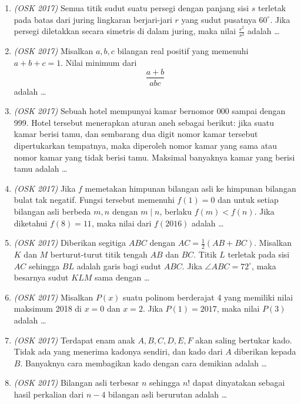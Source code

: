 \documentclass[11pt]{scrartcl}
\begin{document}
\begin{enumerate}
    \item \textit{(OSK 2017)}  Semua titik sudut suatu persegi dengan panjang sisi $s$ terletak pada batas dari juring lingkaran berjari-jari $r$ yang sudut pusatnya $60^\circ$. Jika persegi diletakkan secara simetris di dalam juring, maka nilai $\frac{r^2}{s^2}$ adalah \dots

    \item \textit{(OSK 2017)}  Misalkan $a, b, c$ bilangan real positif yang memenuhi $a + b + c = 1$. Nilai minimum dari 
    \[
    \frac{a + b}{abc}
    \]
    adalah \dots

    \item \textit{(OSK 2017)}  Sebuah hotel mempunyai kamar bernomor 000 sampai dengan 999. Hotel tersebut menerapkan aturan aneh sebagai berikut: jika suatu kamar berisi tamu, dan sembarang dua digit nomor kamar tersebut dipertukarkan tempatnya, maka diperoleh nomor kamar yang sama atau nomor kamar yang tidak berisi tamu. Maksimal banyaknya kamar yang berisi tamu adalah \dots

\item \textit{(OSK 2017)} Jika $f$ memetakan himpunan bilangan asli ke himpunan bilangan bulat tak negatif. Fungsi tersebut memenuhi $f(1) = 0$ dan untuk setiap bilangan asli berbeda $m,n$ dengan $m \mid n$, berlaku $f(m) < f(n)$. Jika diketahui $f(8) = 11$, maka nilai dari $f(2016)$ adalah \dots

\item \textit{(OSK 2017)} Diberikan segitiga $ABC$ dengan $AC = \tfrac12 (AB + BC)$. Misalkan $K$ dan $M$ berturut-turut titik tengah $AB$ dan $BC$. Titik $L$ terletak pada sisi $AC$ sehingga $BL$ adalah garis bagi sudut $ABC$. Jika $\angle ABC = 72^\circ$, maka besarnya sudut $KLM$ sama dengan \dots

\item \textit{(OSK 2017)} Misalkan $P(x)$ suatu polinom berderajat 4 yang memiliki nilai maksimum 2018 di $x=0$ dan $x=2$. Jika $P(1)=2017$, maka nilai $P(3)$ adalah \dots

\item \textit{(OSK 2017)} Terdapat enam anak $A,B,C,D,E,F$ akan saling bertukar kado. Tidak ada yang menerima kadonya sendiri, dan kado dari $A$ diberikan kepada $B$. Banyaknya cara membagikan kado dengan cara demikian adalah \dots

\item \textit{(OSK 2017)} Bilangan asli terbesar $n$ sehingga $n!$ dapat dinyatakan sebagai hasil perkalian dari $n-4$ bilangan asli berurutan adalah \dots


\end{enumerate}
\end{document}
